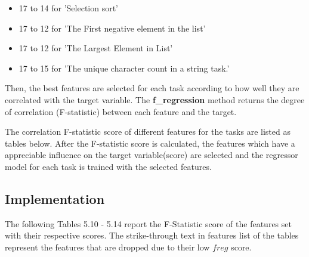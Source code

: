 \begin{itemize}
    \item 17 to 14 for 'Selection sort'
    \item 17 to 12 for 'The First negative element in the list'
    \item 17 to 12 for 'The Largest Element in List'
    \item 17 to 15 for 'The unique character count in a string task.'
\end{itemize}

Then, the best features are selected for each task according to how well they are correlated with the target variable. The \textbf{f\_regression} method \cite{H} returns the degree of correlation (F-statistic) between each feature and the target. 

The correlation F-statistic score of different features for the tasks are listed as tables below. After the F-statistic score is calculated, the features which have a appreciable influence on the target variable(score) are selected and the regressor model for each task is trained with the selected features.

\subsection{Implementation}

The following Tables 5.10 - 5.14 report the F-Statistic score of the features set with their respective scores. The strike-through text in features list of the tables represent the features that are dropped due to their low $f{reg}$ score.


